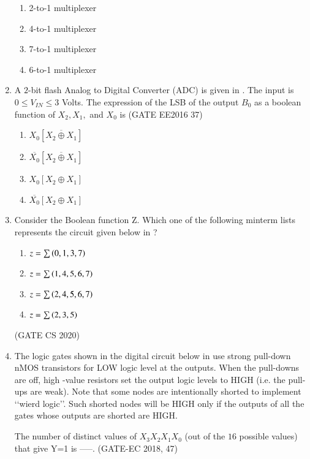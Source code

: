 \begin{enumerate}[label=\arabic*.,ref=\theenumi]
\begin{enumerate}[label=\Alph*.]
\item 2-to-1 multiplexer
\item 4-to-1 multiplexer
\item 7-to-1 multiplexer
\item 6-to-1 multiplexer
\end{enumerate}
\item A $2$-bit flash Analog to Digital Converter (ADC) is given in . The input is $0 \leq V_{IN} \leq 3$ Volts. The expression of the LSB of the output $B_0$ as a boolean function of $X_2,X_1,$ and $X_0$ is \hfill(GATE EE2016 37)
\begin{figure}[H]
\centering
\resizebox{0.75\columnwidth}{!}{%

	}
\caption{}
\label{EE2016_37_fig1}
\end{figure}
\begin{enumerate}
\item $X_0 \left[ \overline {X_2 \oplus X_1} \right]$
\item $\overline {X_0} \left[ \overline {X_2 \oplus X_1} \right]$
\item $X_0 \left[ X_2 \oplus X_1 \right]$
\item $\overline{X_0} \left[ X_2 \oplus X_1 \right]$
\end{enumerate}

\item Consider the Boolean function Z. Which one of the following minterm lists represents the 
 circuit given below  
 in
	 ?
 \begin{figure}[H]
	 \centering
	 \resizebox{0.75\columnwidth}{!}{%

	 }
	 \caption{}
	 \label{fig:GATE CS 2020}
 \end{figure}
\begin{enumerate}[label=\Alph*.]
 \item $z=\sum{\ensuremath{\left(0,1,3,7\right)}}$
 \item $z=\sum{\ensuremath{\left(1,4,5,6,7\right)}}$
 \item $z=\sum{\ensuremath{\left(2,4,5,6,7\right)}}$
 \item $z=\sum{\ensuremath{\left(2,3,5\right)}}$
\end{enumerate}
\hfill (GATE CS 2020)


\item The logic gates shown in the digital circuit below 
in
	use strong pull-down nMOS transistors for LOW logic level at the outputs. When the pull-downs are off, high -value resistors set the output logic levels to HIGH (i.e. the pull-ups are weak). Note that some nodes are intentionally shorted to implement \lq\lq wierd logic\rq\rq. Such shorted nodes will be HIGH only if the outputs of all the gates whose outputs are shorted are HIGH.
\begin{figure}[H]
\centering
\resizebox{0.75\columnwidth}{!}{%

	}
	\caption{}
\label{fig:GATE-EE 2018,47}
\end{figure}
The number of distinct values of $X_3$$X_2$$X_1$$X_0$ (out of the $16$ possible values) that give Y=1 is -----.
\hfill(GATE-EC 2018, 47)



\end{enumerate}
